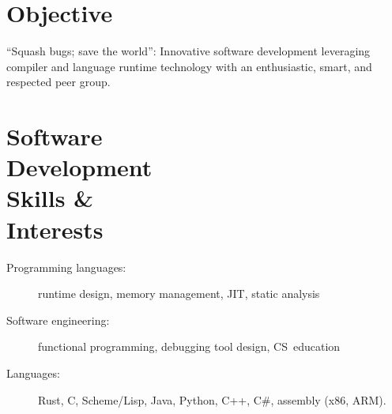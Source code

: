 \documentclass[margin,line,draft]{res}
\def\noneed#1{}
\newcommand{\mysidestyle}{\sc}
\begin{document}
%
\address{42 Pinecliff Dr, Marblehead, MA, 01945 USA\\phone: +1.857.472.3757\\
e-mail: {\tt felix.klock@gmail.com}
}
\begin{resume}
  \vspace{-7mm}

    \section{\mysidestyle Objective}
    ``Squash bugs; save the world'': Innovative software development
    leveraging %
    compiler and language runtime technology
    with an enthusiastic, smart, and respected peer group.

    \vspace{-4mm}
    \section{\mysidestyle Software\\Development\\Skills \&\\Interests}
    \begin{description}
      \item[\rm Programming languages:] runtime design, memory management, JIT, static analysis
        \vspace{-1ex}
      \item[\rm Software engineering:] functional programming, \noneed{system modeling, }debugging tool design, CS~education%
        \noneed{\\ Programming Language Design: Type and Effect Systems, Syntatic Extension}
        \vspace{-1ex}
      \item[\rm Languages:] Rust, C, Scheme/Lisp, Java, Python, C++, C\#, assembly (x86, ARM)\noneed{FORTH, \LaTeXe}.
    \end{description}

\end{resume}
\end{document}
